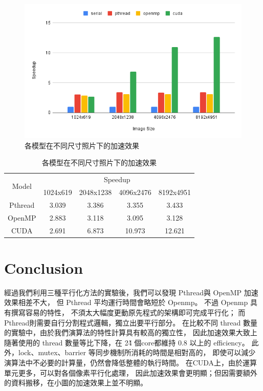 \documentclass[sigconf,nonacm]{acmart}
\begin{document}
\begin{figure}[htbp]
  \centering
  \includegraphics[width=\linewidth]{"./image/all_model.png"}
  \caption{各模型在不同尺寸照片下的加速效果}
  \label{fig:all_model}
\end{figure}

\begin{table}[htbp]
  \centering
  \begin{tabular}{|c|c|c|c|c|}
  \hline
  \multirow{2}{*}{Model} & \multicolumn{4}{c|}{Speedup} \\ \cline{2-5} 
                         & 1024x619    & 2048x1238   & 4096x2476   & 8192x4951  \\ \hline
  Pthread                & 3.039       & 3.386       & 3.355       & 3.433      \\ \hline
  OpenMP                 & 2.883       & 3.118       & 3.095       & 3.128      \\ \hline
  CUDA                   & 2.691       & 6.873       & 10.973      & 12.621     \\ \hline
  \end{tabular}
  \caption{各模型在不同尺寸照片下的加速效果}
  \label{tab:all_model}
\end{table}

\section{Conclusion}

經過我們利用三種平行化方法的實驗後，我們可以發現 Pthread與 OpenMP 加速效果相差不大，
但 Pthread 平均運行時間會略短於 Openmp。
不過 Openmp 具有撰寫容易的特性，
不須太大幅度更動原先程式的架構即可完成平行化；
而Pthread則需要自行分割程式邏輯，獨立出要平行部分。
在比較不同 thread 數量的實驗中，由於我們演算法的特性計算具有較高的獨立性，
因此加速效果大致上隨著使用的 thread 數量等比下降，在 2\~4 個core都維持 0.8 以上的 efficiency。
此外，lock、mutex、barrier 等同步機制所消耗的時間是相對高的，
即使可以減少演算法中不必要的計算量，仍然會降低整體的執行時間。
在CUDA上，由於運算單元更多，可以對各個像素平行化處理，
因此加速效果會更明顯；但因需要額外的資料搬移，在小圖的加速效果上並不明顯。
\end{document}
